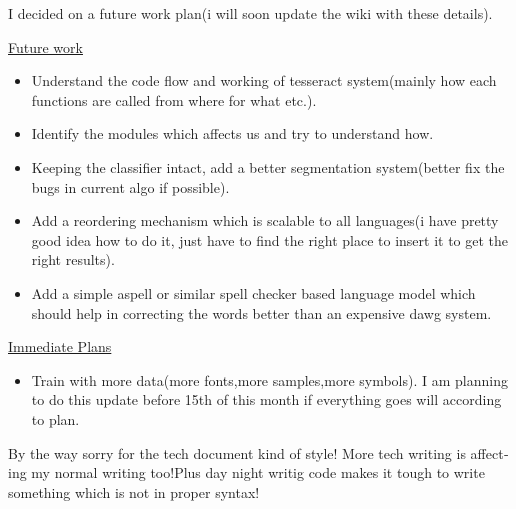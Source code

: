 \begin{english}
I decided on a future work plan(i will soon update the wiki with these details).

\underline{Future work}
\begin{itemize}
    \item Understand the code flow and working of tesseract system(mainly how each functions are called from where for what etc.).
    \item Identify the modules which affects us and try to understand how.
    \item Keeping the classifier intact, add a better segmentation system(better fix the bugs in current algo if possible).
    \item Add a reordering mechanism which is scalable to all languages(i have pretty good idea how to do it, just have to find the right place to insert it to get the right results).
    \item Add a simple aspell or similar spell checker based language model which should help in correcting the words better than an expensive dawg system.
\end{itemize}

\underline{Immediate Plans}
\begin{itemize}
    \item Train with more data(more fonts,more samples,more symbols). I am planning to do this update before 15th of this month if everything goes will according to plan.
\end{itemize}

By the way sorry for the tech document kind of style! More tech writing is affecting my normal writing too!Plus day night writig code makes it tough to write something which is not in proper syntax!
\end{english}
